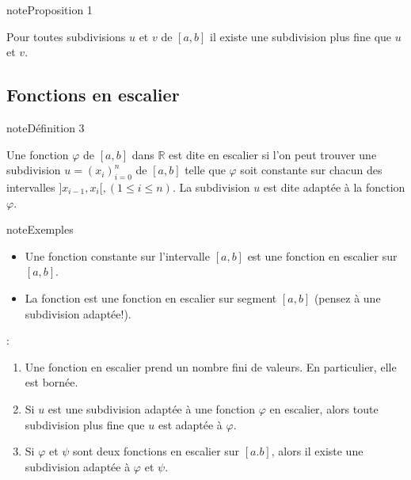 \documentclass[letterpaper,10pt,french]{jupyterBook}
\begin{document}
\begin{sphinxadmonition}{note}{Proposition 1}

\sphinxAtStartPar
Pour toutes subdivisions \(u\) et \(v\) de \([a, b]\) il existe une subdivision plus fine que  \(u\) et \(v\).
\end{sphinxadmonition}


\subsection{Fonctions en escalier}
\label{\detokenize{fe:fonctions-en-escalier}}
\begin{sphinxadmonition}{note}{Définition 3}

\sphinxAtStartPar
Une fonction \(\varphi\) de \([a,b]\) dans \(\mathbb{R}\) est dite en escalier si l’on peut trouver une subdivision \(u=(x_i)_{i=0}^n\) de \([a, b]\) telle que \(\varphi\) soit constante sur chacun des intervalles \(]x_{i-1}, x_i[, (1\leq i \leq n)\).
La subdivision \(u\) est dite adaptée à la fonction \(\varphi\).
\end{sphinxadmonition}

\begin{sphinxadmonition}{note}{Exemples}
\begin{itemize}
\item {} 
\sphinxAtStartPar
Une fonction constante sur l’intervalle \([a,b]\) est une fonction en escalier sur \([a,b]\).

\item {} 
\sphinxAtStartPar
La fonction  est une fonction en escalier sur segment \([a,b]\) (pensez à une subdivision adaptée!).

\end{itemize}
\end{sphinxadmonition}

\sphinxAtStartPar
{}:
\begin{enumerate}
%
\item {} 
\sphinxAtStartPar
Une fonction en escalier prend un nombre fini de valeurs. En particulier, elle est bornée.

\item {} 
\sphinxAtStartPar
Si \(u\) est une subdivision adaptée à une fonction \(\varphi\) en escalier, alors toute subdivision plus fine que \(u\) est adaptée à \(\varphi\).

\item {} 
\sphinxAtStartPar
Si \(\varphi\) et \(\psi\) sont deux fonctions en escalier sur \([a. b]\), alors il existe une subdivision adaptée à \(\varphi\) et \(\psi\).

\end{enumerate}
\end{document}
